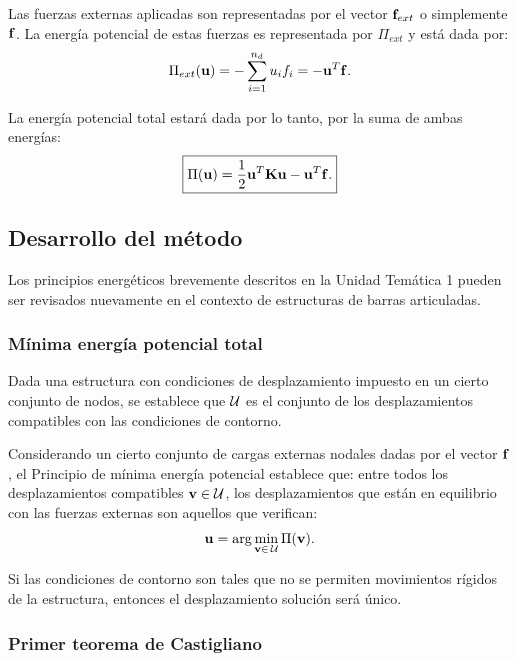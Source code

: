 Las fuerzas externas aplicadas son representadas por el vector ${\bf f}_{ext}$ o simplemente ${\bf f}$. %
%
La energía potencial de estas fuerzas es representada por $\Pi_{ext}$ y está dada por:
%
\begin{equation}
 \Pi_{ext}({\bf u}) = - \sum_{i=1}^{n_d} u_i f_i = - {\bf u}^T {\bf f} .
\end{equation}
%

La energía potencial total estará dada por lo tanto, por la suma de ambas energías:
%
\begin{equation}
\boxed{
\Pi({\bf u}) = \frac{1}{2} {\bf u}^T {\bf K} {\bf u} - {\bf u}^T {\bf f} .
}
\end{equation}



\subsection{Desarrollo del método}

Los principios energéticos brevemente descritos en la Unidad Temática 1 pueden ser revisados nuevamente en el contexto de estructuras de barras articuladas.


\subsubsection{Mínima energía potencial total}

Dada una estructura con condiciones de desplazamiento impuesto en un cierto conjunto de nodos, se establece que ${\mathcal U}$ es el conjunto de los desplazamientos compatibles con las condiciones de contorno. %
%


Considerando un cierto conjunto de cargas externas nodales dadas por el vector ${\bf f}$, el Principio de mínima energía potencial establece que: entre todos los desplazamientos compatibles ${\bf v} \in {\mathcal U}$, los desplazamientos que están en equilibrio con las fuerzas externas son aquellos que verifican:
%
\begin{equation}
{\bf u} = \arg\min_{{\bf v} \in \, {\mathcal U}} \Pi({\bf v}).
\end{equation}

Si las condiciones de contorno son tales que no se permiten movimientos rígidos de la estructura, entonces el desplazamiento solución será único.


\subsubsection{Primer teorema de Castigliano}

